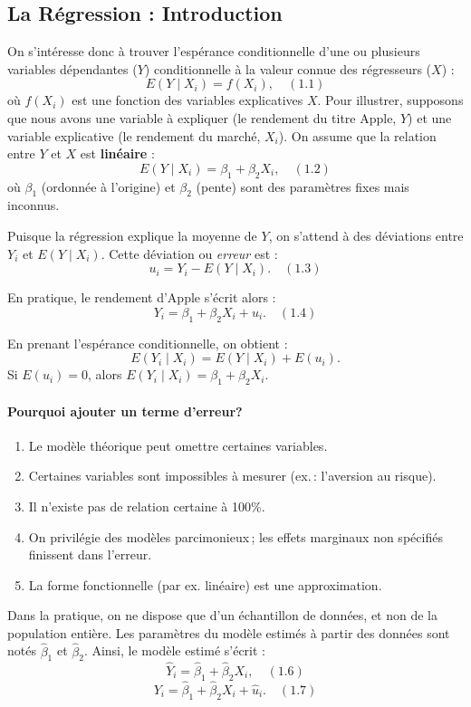 \documentclass[14pt]{extarticle} %
\begin{document}
\subsection{La Régression : Introduction}

On s’intéresse donc à trouver l’espérance conditionnelle d’une ou plusieurs variables dépendantes (\(Y\)) conditionnelle à la valeur connue des régresseurs (\(X\)) :
\[
E(Y \mid X_i) = f(X_i), \quad (1.1)
\]
où \( f(X_i) \) est une fonction des variables explicatives \( X \). Pour illustrer, supposons que nous avons une variable à expliquer (le rendement du titre Apple, \(Y\)) et une variable explicative (le rendement du marché, \(X_i\)). On assume que la relation entre \(Y\) et \(X\) est \textbf{linéaire} :
\[
E(Y \mid X_i) = \beta_1 + \beta_2 X_i, \quad (1.2)
\]
où \(\beta_1\) (ordonnée à l’origine) et \(\beta_2\) (pente) sont des paramètres fixes mais inconnus.

Puisque la régression explique la moyenne de \(Y\), on s’attend à des déviations entre \(Y_i\) et \(E(Y \mid X_i)\). Cette déviation ou \emph{erreur} est :
\[
u_i = Y_i - E(Y \mid X_i). \quad (1.3)
\]

En pratique, le rendement d’Apple s’écrit alors :
\[
Y_i = \beta_1 + \beta_2 X_i + u_i. \quad (1.4)
\]

En prenant l’espérance conditionnelle, on obtient :
\[
E(Y_i \mid X_i) = E(Y \mid X_i) + E(u_i).
\]
Si \(E(u_i) = 0\), alors \(E(Y_i \mid X_i) = \beta_1 + \beta_2 X_i\).

\paragraph{Pourquoi ajouter un terme d’erreur?}
\begin{enumerate}
    \item Le modèle théorique peut omettre certaines variables.
    \item Certaines variables sont impossibles à mesurer (ex. : l’aversion au risque).
    \item Il n’existe pas de relation certaine à 100\%.
    \item On privilégie des modèles parcimonieux ; les effets marginaux non spécifiés finissent dans l’erreur.
    \item La forme fonctionnelle (par ex. linéaire) est une approximation.
\end{enumerate}

Dans la pratique, on ne dispose que d’un échantillon de données, et non de la population entière. Les paramètres du modèle estimés à partir des données sont notés \(\hat{\beta}_1\) et \(\hat{\beta}_2\). Ainsi, le modèle estimé s’écrit :
\[
\hat{Y}_i = \hat{\beta}_1 + \hat{\beta}_2 X_i, \quad (1.6)
\]
\[
Y_i = \hat{\beta}_1 + \hat{\beta}_2 X_i + \hat{u}_i. \quad (1.7)
\]
\end{document}
